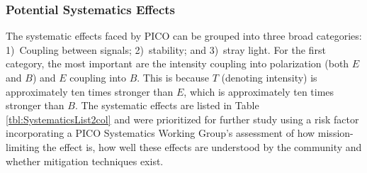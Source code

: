\documentclass[PICOReport.tex]{subfiles}
\begin{document}





\subsubsection{Potential Systematics Effects}
\label{sec:systematics_list}


The systematic effects faced by PICO can be grouped into three broad categories: 1)~Coupling between signals; 2)~stability; and 3)~stray light. For the first category, the most important are the intensity coupling into polarization (both $E$ and $B$) and $E$ coupling into $B$. This is because $T$ (denoting intensity) is approximately ten times stronger than $E$, which is approximately ten times stronger than $B$. The systematic effects are listed in Table \ref{tbl:SystematicsList2col} and were prioritized for further study using a risk factor incorporating a PICO Systematics Working Group's assessment of how mission-limiting the effect is, how well these effects are understood by the community and whether mitigation techniques exist.  
\end{document}
